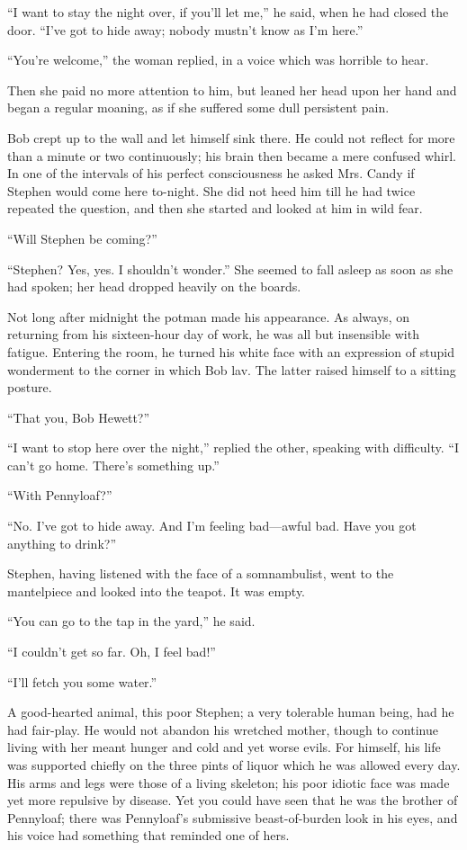 ``I want to stay the night over, if you'll let me,'' he said, when he
had closed the door. ``I've got to hide away; nobody mustn't know as I'm
here.''

``You're welcome,'' the woman replied, in a voice which was horrible to
hear.

{}Then she paid no more attention to him, but leaned her head upon her
hand and began a regular moaning, as if she suffered some dull
persistent pain.

Bob crept up to the wall and let himself sink there. He could not
reflect for more than a minute or two continuously; his brain then
became a mere confused whirl. In one of the intervals of his perfect
consciousness he asked Mrs. Candy if Stephen would come here to-night.
She did not heed him till he had twice repeated the question, and then
she started and looked at him in wild fear.

``Will Stephen be coming?''

``Stephen? Yes, yes. I shouldn't wonder.'' She seemed to fall asleep as
soon as she had spoken; her head dropped heavily on the boards.

Not long after midnight the potman made his appearance. As always, on
returning from his sixteen-hour day of work, he was all but insensible
with fatigue. Entering the room, he turned his white face with an
expression of stupid wonderment to the corner in which Bob lav. The
latter raised himself to a sitting posture.

{}``That you, Bob Hewett?''

``I want to stop here over the night,'' replied the other, speaking with
difficulty. ``I can't go home. There's something up.''

``With Pennyloaf?''

``No. I've got to hide away. And I'm feeling bad---awful bad. Have you
got anything to drink?''

Stephen, having listened with the face of a somnambulist, went to the
mantelpiece and looked into the teapot. It was empty.

``You can go to the tap in the yard,'' he said.

``I couldn't get so far. Oh, I feel bad!''

``I'll fetch you some water.''

A good-hearted animal, this poor Stephen; a very tolerable human being,
had he had fair-play. He would not abandon his wretched mother, though
to continue living with her meant hunger and cold and yet worse evils.
For himself, his life was supported chiefly on the three pints of liquor
which he was allowed every day. His arms and legs were those of a living
skeleton; his poor idiotic face was made yet more repulsive by disease.
Yet you could have seen that he was the brother of Pennyloaf; there was
Pennyloaf's submissive {}beast-of-burden look in his eyes, and his voice
had something that reminded one of hers.

